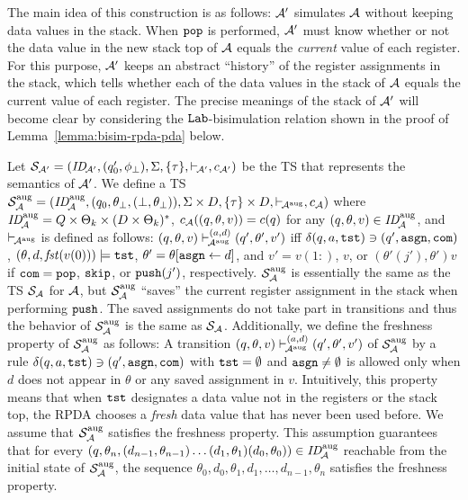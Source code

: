 The main idea of this construction is as follows:
${\cal A}'$ simulates ${\cal A}$ without keeping data values in
the stack.
When $\mathtt{pop}$ is performed,
${\cal A}'$ must know whether or not
the data value in the new stack top of ${\cal A}$
equals the \emph{current} value of each register.
For this purpose,
${\cal A}'$ keeps an abstract ``history'' of
the register assignments in the stack,
which tells whether
each of the data values in the stack of ${\cal A}$ equals
the current value of each register.
The precise meanings of the stack of ${\cal A}'$
will become clear
by considering the $\mathtt{Lab}$-bisimulation relation
shown in the proof of Lemma~\ref{lemma:bisim-rpda-pda} below.

Let %
${\cal S}_{{\cal A}'}=(\mathit{ID}_{\!{\cal A}'},(q'_0,\phi_{\bot}),\allowbreak
\Sigma,\{\tau\},{\vdash_{\!{\cal A}'}},c_{{\cal A}'})$ be the TS
that represents the semantics of ${\cal A}'$.
We define a TS
${\cal S}_{{\cal A}}^{\mathrm{aug}}=
(\mathit{ID}_{\!{\cal A}}^{\mathrm{aug}},(q_0,\theta_{\bot},(\bot,\theta_{\bot})),
\Sigma\times D,\{\tau\}\times D,{\vdash_{\!{\cal A}^{\mathrm{aug}}}},c_{{\cal A}})$
where
$\mathit{ID}_{\!{\cal A}}^{\mathrm{aug}}=Q\times\Theta_k\times(D\times\Theta_k)^*$,
$c_{{\cal A}}((q,\theta,v))=c(q)$ for
any $(q,\theta,v)\in\mathit{ID}_{\!{\cal A}}^{\mathrm{aug}}$,
and $\vdash_{\!{\cal A}^{\mathrm{aug}}}$ is defined as follows:
$(q,\theta,v)\vdash_{\!{\cal A}^{\mathrm{aug}}}^{(a,d)}(q',\theta',v')$
iff
$\delta(q,a,\mathtt{tst})\ni (q',\mathtt{asgn},\mathtt{com})$,
$(\theta,d,\mathit{fst}(v(0)))\models\mathtt{tst}$,
$\theta'=\theta[\mathtt{asgn}\gets d]$, and
$v'= v(1{:})$, $v$, or $(\theta'(j'),\theta')v$
if $\mathtt{com}=\mathtt{pop}$, $\mathtt{skip}$, or $\mathtt{push}(j')$, respectively.
${\cal S}_{{\cal A}}^{\mathrm{aug}}$ is essentially
the same as the TS ${\cal S}_{{\cal A}}$ for ${\cal A}$,
but ${\cal S}_{{\cal A}}^{\mathrm{aug}}$
``saves'' the current register assignment in the stack
when performing $\mathtt{push}$.
The saved assignments do not take part in transitions and thus
the behavior of 
${\cal S}_{{\cal A}}^{\mathrm{aug}}$ is the same as ${\cal S}_{{\cal A}}$.
Additionally,
we define the freshness property of ${\cal S}_{{\cal A}}^{\mathrm{aug}}$
as follows:
A transition
$(q,\theta,v)\vdash_{\!{\cal A}^{\mathrm{aug}}}^{(a,d)}(q',\theta',v')$
of ${\cal S}_{{\cal A}}^{\mathrm{aug}}$
by a rule
$\delta(q,a,\mathtt{tst})\ni (q',\mathtt{asgn},\mathtt{com})$ with $\mathtt{tst}=\emptyset$ and
$\mathtt{asgn}\ne\emptyset$ is allowed
only when $d$ does not appear in $\theta$ or any saved assignment in $v$.
Intuitively,
this property means that when $\mathtt{tst}$ designates a data value not in
the registers or the stack top,
the RPDA chooses a \emph{fresh} data value that has never been used before.
We assume that ${\cal S}_{{\cal A}}^{\mathrm{aug}}$ satisfies the freshness property.
This assumption guarantees that
for every
$(q,\theta_n,(d_{n-1},\theta_{n-1})\ldots(d_1,\theta_1)(d_0,\theta_0))
\in\mathit{ID}_{\!{\cal A}}^{\mathrm{aug}}$ reachable from the initial state of
${\cal S}_{{\cal A}}^{\mathrm{aug}}$,
the sequence
$\theta_0,d_0,\theta_1,d_1,\ldots,d_{n-1},\theta_n$ satisfies
the freshness property.

